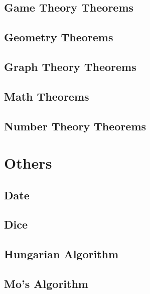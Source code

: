 \subsection{Game Theory Theorems}
\raggedbottom
\hrulefill
\subsection{Geometry Theorems}
\raggedbottom
\hrulefill
\subsection{Graph Theory Theorems}
\raggedbottom
\hrulefill
\subsection{Math Theorems}
\raggedbottom
\hrulefill
\subsection{Number Theory Theorems}
\raggedbottom
\hrulefill

\section{Others}
\subsection{Date}
\raggedbottom
\hrulefill
\subsection{Dice}
\raggedbottom
\hrulefill
\subsection{Hungarian Algorithm}
\raggedbottom
\hrulefill
\subsection{Mo's Algorithm}
\raggedbottom
\hrulefill
